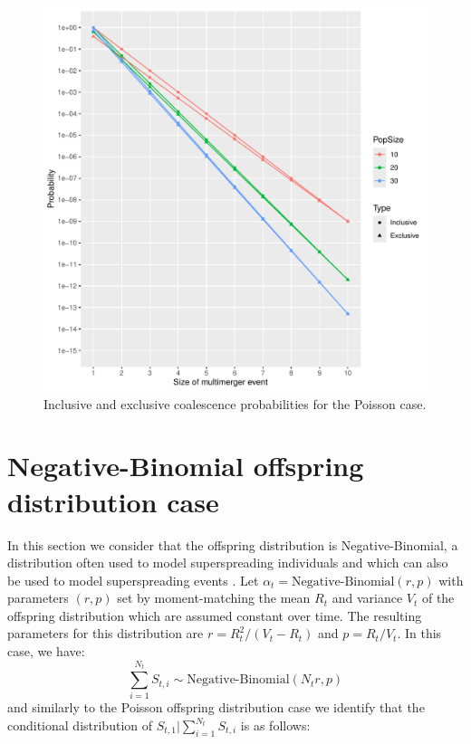 \documentclass{article}
\begin{document}
\begin{figure}[!p]
\begin{center}
\includegraphics[width=15cm]{../run/figurePois.pdf}
\end{center}
\caption{Inclusive and exclusive coalescence probabilities for the Poisson case.
\label{fig:pois}}
\end{figure}

\section{Negative-Binomial offspring distribution case}

In this section we consider that the offspring distribution is 
Negative-Binomial, a distribution often used to model superspreading individuals
\citep{Lloyd-Smith2005} and which can also be used to model superspreading events 
\citep{Craddock2025}.
Let $\alpha_t=\text{Negative-Binomial}(r,p)$ with parameters $(r,p)$ set by moment-matching the mean $R_t$ and variance $V_t$ of the offspring distribution
which are assumed constant over time.
The resulting parameters for this distribution are $r=R_t^2/(V_t-R_t)$ and $p=R_t/V_t$.
In this case, we have:
	\begin{equation}
		\sum_{i=1}^{N_t} S_{t,i} \sim \text{Negative-Binomial}(N_t r,p)
	\end{equation}
and similarly to the Poisson offspring distribution case we identify that the conditional distribution of $S_{t,1} | \sum_{i=1}^{N_t} S_{t,i}$ is as follows:
\end{document}
